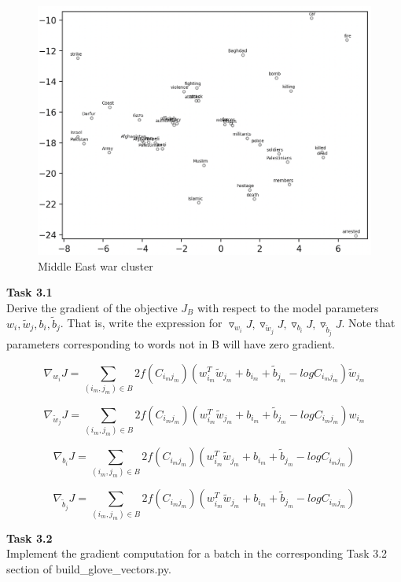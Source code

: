 \documentclass[12pt,article]{article}
\newenvironment{task}[2][Task]
    { \begin{mdframed}[backgroundcolor=gray!20] \textbf{#1 #2} \\}
    {  \end{mdframed}}
\begin{document}
\begin{figure}[H]
    \centering
    \includegraphics[scale=0.6]{middleeast_war.png} \par
    \caption{Middle East war cluster}
    \label{fig:q2-middle-east}
\end{figure}

\newpage
\begin{task}{3.1}
Derive the gradient of the objective $J_B$ with respect to the model parameters $w_i, \widetilde{w}_j, b_i, \widetilde{b}_j$. That is, write the expression for $\triangledown_{w_i}J, \triangledown_{\widetilde{w}_j}J, \triangledown_{b_i}J, \triangledown_{\widetilde{b}_j}J$. Note that parameters corresponding to words not in B will have zero gradient.
\end{task}
$$\nabla_{w_i}J = \sum_{(i_m,j_m) \in B} 2 f(C_{i_mj_m})(w_{i_m}^T\widetilde{w}_{j_m} + b_{i_m} + \widetilde{b}_{j_m} - logC_{i_mj_m})\widetilde{w}_{j_m}$$

$$\nabla_{\widetilde{w}_j}J = \sum_{(i_m,j_m) \in B} 2 f(C_{i_mj_m})(w_{i_m}^T\widetilde{w}_{j_m} + b_{i_m} + \widetilde{b}_{j_m} - logC_{i_mj_m})w_{i_m}$$

$$\nabla_{b_i}J = \sum_{(i_m,j_m) \in B} 2 f(C_{i_mj_m})(w_{i_m}^T\widetilde{w}_{j_m} + b_{i_m} + \widetilde{b}_{j_m} - logC_{i_mj_m})$$

$$\nabla_{\widetilde{b}_j}J = \sum_{(i_m,j_m) \in B} 2 f(C_{i_mj_m})(w_{i_m}^T\widetilde{w}_{j_m} + b_{i_m} + \widetilde{b}_{j_m} - logC_{i_mj_m})$$

\begin{task}{3.2} 
Implement the gradient computation for a batch in the corresponding Task 3.2 section of build\_glove\_vectors.py.
\end{task}
\end{document}
